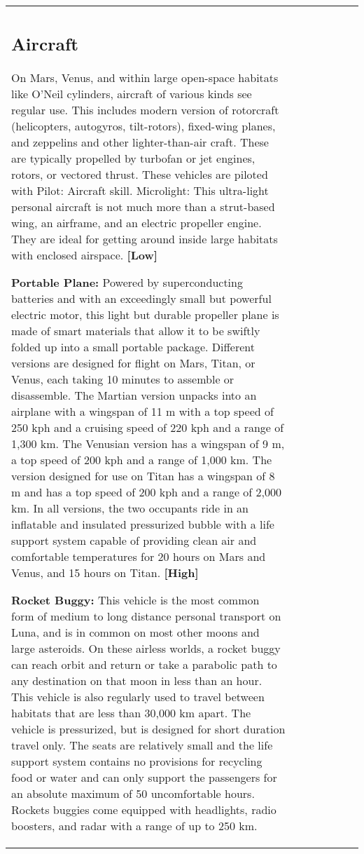 \begin{tabular}{|l|l|l|l|l|l|l|}
\subsection{Aircraft} \label{sec:aircraft} 

On Mars, Venus, and within large open-space habitats like O’Neil cylinders, aircraft of various kinds see regular use. This includes modern version of rotorcraft (helicopters, autogyros, tilt-rotors), fixed-wing planes, and zeppelins and other lighter-than-air craft. These are typically propelled by turbofan or jet engines, rotors, or vectored thrust. These vehicles are piloted with Pilot: Aircraft skill. Microlight: This ultra-light personal aircraft is not much more than a strut-based wing, an airframe, and an electric propeller engine. They are ideal for getting around inside large habitats with enclosed airspace. \textbf{[Low]} 

\textbf{Portable Plane:} Powered by superconducting batteries and with an exceedingly small but powerful electric motor, this light but durable propeller plane is made of smart materials that allow it to be swiftly folded up into a small portable package. Different versions are designed for flight on Mars, Titan, or Venus, each taking 10 minutes to assemble or disassemble. The Martian version unpacks into an airplane with a wingspan of 11 m with a top speed of 250 kph and a cruising speed of 220 kph and a range of 1,300 km. The Venusian version has a wingspan of 9 m, a top speed of 200 kph and a range of 1,000 km. The version designed for use on Titan has a wingspan of 8 m and has a top speed of 200 kph and a range of 2,000 km. In all versions, the two occupants ride in an inflatable and insulated pressurized bubble with a life support system capable of providing clean air and comfortable temperatures for 20 hours on Mars and Venus, and 15 hours on Titan. \textbf{[High]} 

\textbf{Rocket Buggy:} This vehicle is the most common form of medium to long distance personal transport on Luna, and is in common on most other moons and large asteroids. On these airless worlds, a rocket buggy can reach orbit and return or take a parabolic path to any destination on that moon in less than an hour. This vehicle is also regularly used to travel between habitats that are less than 30,000 km apart. The vehicle is pressurized, but is designed for short duration travel only. The seats are relatively small and the life support system contains no provisions for recycling food or water and can only support the passengers for an absolute maximum of 50 uncomfortable hours. Rockets buggies come equipped with headlights, radio boosters, and radar with a range of up to 250 km. 


\end{tabular}

